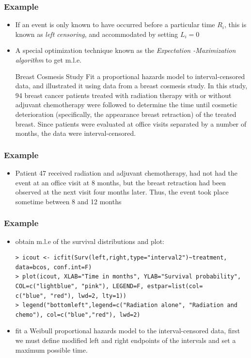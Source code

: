 \documentclass{beamer}
\newcommand{\empr}[1]{{\emph{\color{red}#1}}}
\begin{document}
\pagebreak
\begin{frame}
\frametitle{Example}
\begin{itemize}
\item If an event is only known to have occurred before a particular time $R_i$, this is known as \empr{left censoring}, and accommodated by setting $L_i = 0$
\item A special optimization technique known as the \empr{Expectation
-Maximization algorithm} to get m.l.e.
\begin{problock}{Breast Cosmesis Study}
Fit a proportional hazards model to interval-censored data, and illustrated it using data from a breast cosmesis study. In this study, 94 breast cancer patients treated with radiation therapy with or without adjuvant chemotherapy were followed to determine the time until cosmetic deterioration (specifically, the appearance breast retraction) of the treated breast. Since patients were evaluated at office visits separated by a number of months, the data were interval-censored.
\end{problock}
\end{itemize}
\end{frame}

\pagebreak
\begin{frame}[fragile]
\frametitle{Example}
\begin{itemize}
\begin{Verbatim}
> library(interval)
> data(bcos)
> bcos[c(1,33, 47, 62, 90),]
       left    right    treatment 
1       45       Inf          Rad 
33       0         5          Rad 
47       8        12      RadChem 
62      14        17      RadChem
90      16        60      RadChem
\end{Verbatim}
\item  Patient 47 received radiation and adjuvant chemotherapy, had not had the event at an office visit at 8 months, but the breast retraction had been observed at the next visit four months later. Thus, the event took place sometime between 8 and 12 months
\end{itemize}
\end{frame}

\pagebreak
\begin{frame}[fragile]
\frametitle{Example}
\begin{itemize}
\item obtain m.l.e of the survival distributions and plot:
\begin{Verbatim}
> icout <- icfit(Surv(left,right,type="interval2")~treatment,
data=bcos, conf.int=F)
> plot(icout, XLAB="Time in months", YLAB="Survival probability", 
COL=c("lightblue", "pink"), LEGEND=F, estpar=list(col=
c("blue", "red"), lwd=2, lty=1))
> legend("bottomleft",legend=c("Radiation alone", "Radiation and 
chemo"), col=c("blue","red"), lwd=2)
\end{Verbatim}
\item fit a Weibull proportional hazards model to the interval-censored data, first we must define modified left and right endpoints of the intervals and set a maximum possible time.
\end{itemize}
\end{frame}
\end{document}
